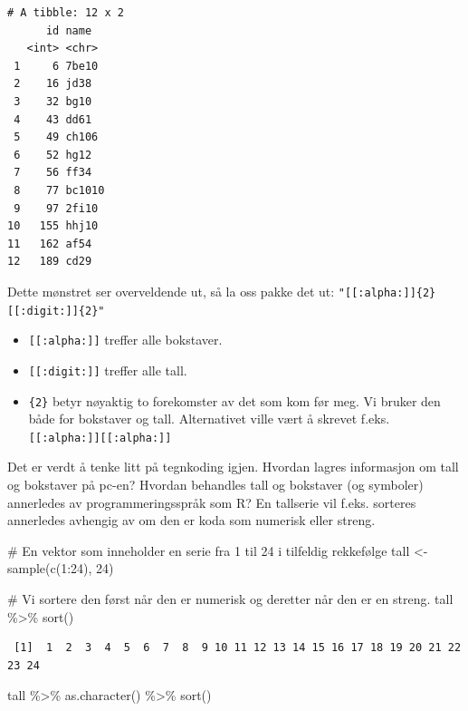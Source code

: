 \documentclass[
  letterpaper,
  DIV=11,
  numbers=noendperiod]{scrreprt}
\newenvironment{Shaded}{\begin{snugshade}}{\end{snugshade}}
\newcommand{\CommentTok}[1]{\textcolor[rgb]{0.37,0.37,0.37}{#1}}
\newcommand{\DecValTok}[1]{\textcolor[rgb]{0.68,0.00,0.00}{#1}}
\newcommand{\FunctionTok}[1]{\textcolor[rgb]{0.28,0.35,0.67}{#1}}
\newcommand{\NormalTok}[1]{\textcolor[rgb]{0.00,0.23,0.31}{#1}}
\newcommand{\OtherTok}[1]{\textcolor[rgb]{0.00,0.23,0.31}{#1}}
\newcommand{\SpecialCharTok}[1]{\textcolor[rgb]{0.37,0.37,0.37}{#1}}
\providecommand{\tightlist}{%
  \setlength{\itemsep}{0pt}\setlength{\parskip}{0pt}}\usepackage{longtable,booktabs,array}
\begin{document}
\begin{verbatim}
# A tibble: 12 x 2
      id name  
   <int> <chr> 
 1     6 7be10 
 2    16 jd38  
 3    32 bg10  
 4    43 dd61  
 5    49 ch106 
 6    52 hg12  
 7    56 ff34  
 8    77 bc1010
 9    97 2fi10 
10   155 hhj10 
11   162 af54  
12   189 cd29  
\end{verbatim}

Dette mønstret ser overveldende ut, så la oss pakke det ut:
\texttt{"{[}{[}:alpha:{]}{]}\{2\}{[}{[}:digit:{]}{]}\{2\}"}

\begin{itemize}
\tightlist
\item
  \texttt{{[}{[}:alpha:{]}{]}} treffer alle bokstaver.
\item
  \texttt{{[}{[}:digit:{]}{]}} treffer alle tall.
\item
  \texttt{\{2\}} betyr nøyaktig to forekomster av det som kom før meg.
  Vi bruker den både for bokstaver og tall. Alternativet ville vært å
  skrevet f.eks. \texttt{{[}{[}:alpha:{]}{]}{[}{[}:alpha:{]}{]}}
\end{itemize}

Det er verdt å tenke litt på tegnkoding igjen. Hvordan lagres
informasjon om tall og bokstaver på pc-en? Hvordan behandles tall og
bokstaver (og symboler) annerledes av programmeringsspråk som R? En
tallserie vil f.eks. sorteres annerledes avhengig av om den er koda som
numerisk eller streng.

\begin{Shaded}
\begin{Highlighting}[]
\CommentTok{\# En vektor som inneholder en serie fra 1 til 24 i tilfeldig rekkefølge}
\NormalTok{tall }\OtherTok{\textless{}{-}} \FunctionTok{sample}\NormalTok{(}\FunctionTok{c}\NormalTok{(}\DecValTok{1}\SpecialCharTok{:}\DecValTok{24}\NormalTok{), }\DecValTok{24}\NormalTok{)}

\CommentTok{\# Vi sortere den først når den er numerisk og deretter når den er en streng.}
\NormalTok{tall }\SpecialCharTok{\%\textgreater{}\%} \FunctionTok{sort}\NormalTok{()}
\end{Highlighting}
\end{Shaded}

\begin{verbatim}
 [1]  1  2  3  4  5  6  7  8  9 10 11 12 13 14 15 16 17 18 19 20 21 22 23 24
\end{verbatim}

\begin{Shaded}
\begin{Highlighting}[]
\NormalTok{tall }\SpecialCharTok{\%\textgreater{}\%} \FunctionTok{as.character}\NormalTok{() }\SpecialCharTok{\%\textgreater{}\%} \FunctionTok{sort}\NormalTok{()}
\end{Highlighting}
\end{Shaded}
\end{document}
